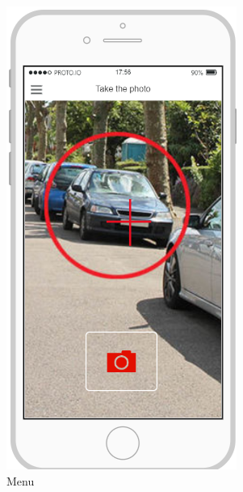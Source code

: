 \documentclass{article}
\begin{document}
\begin{figure}[H]
				\begin{subfigure}[H]{0.25\linewidth}
					\includegraphics[width=\linewidth]{Images/Camera.png}
					\caption{Menu}
				\end{subfigure}
				\begin{subfigure}[H]{0.25\linewidth}

\end{subfigure}
\end{figure}
\end{document}
